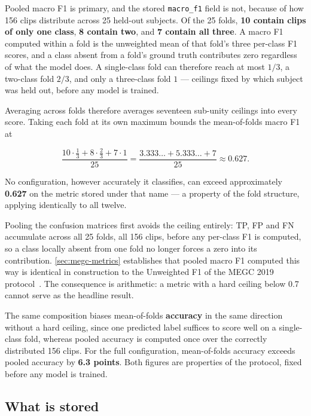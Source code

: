 Pooled macro F1 is primary, and the stored \texttt{macro\_f1} field is not, because of how 156 clips distribute across 25 held-out subjects. Of the 25 folds, \textbf{10 contain clips of only one class}, \textbf{8 contain two}, and \textbf{7 contain all three}. A macro F1 computed within a fold is the unweighted mean of that fold's three per-class F1 scores, and a class absent from a fold's ground truth contributes zero regardless of what the model does. A single-class fold can therefore reach at most $1/3$, a two-class fold $2/3$, and only a three-class fold $1$ --- ceilings fixed by which subject was held out, before any model is trained.

Averaging across folds therefore averages seventeen sub-unity ceilings into every score. Taking each fold at its own maximum bounds the mean-of-folds macro F1 at

\[
	\frac{10 \cdot \tfrac13 + 8 \cdot \tfrac23 + 7 \cdot 1}{25} = \frac{3.333\ldots + 5.333\ldots + 7}{25} \approx 0.627.
\]

No configuration, however accurately it classifies, can exceed approximately \textbf{0.627} on the metric stored under that name --- a property of the fold structure, applying identically to all twelve.

Pooling the confusion matrices first avoids the ceiling entirely: TP, FP and FN accumulate across all 25 folds, all 156 clips, before any per-class F1 is computed, so a class locally absent from one fold no longer forces a zero into its contribution. \autoref{sec:megc-metrics} establishes that pooled macro F1 computed this way is identical in construction to the Unweighted F1 of the MEGC 2019 protocol~\cite{see2019}. The consequence is arithmetic: a metric with a hard ceiling below 0.7 cannot serve as the headline result.

The same composition biases mean-of-folds \textbf{accuracy} in the same direction without a hard ceiling, since one predicted label suffices to score well on a single-class fold, whereas pooled accuracy is computed once over the correctly distributed 156 clips. For the full configuration, mean-of-folds accuracy exceeds pooled accuracy by \textbf{6.3 points}. Both figures are properties of the protocol, fixed before any model is trained.

\subsection{What is stored}
\label{sec:what-is-stored}

